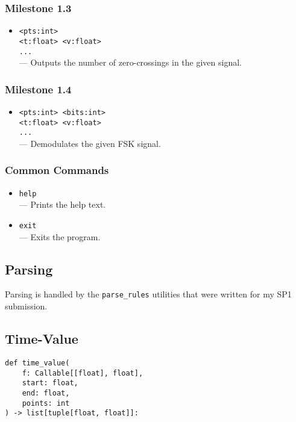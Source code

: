 \documentclass{article}
\begin{document}
			\subsubsection{Milestone 1.3}
				\begin{itemize}
					\item \verb|<pts:int>| \\
						\verb|<t:float> <v:float>| \\
						\verb|...| \\
						--- Outputs the number of zero-crossings in the given signal.
				\end{itemize}

			\subsubsection{Milestone 1.4}
				\begin{itemize}
					\item \verb|<pts:int> <bits:int>| \\
						\verb|<t:float> <v:float>| \\
						\verb|...| \\
						--- Demodulates the given FSK signal.
				\end{itemize}

			\subsubsection{Common Commands}
				\begin{itemize}
					\item \verb|help| \\
						--- Prints the help text.
					\item \verb|exit| \\
						--- Exits the program.
				\end{itemize}

			\pagebreak



		\subsection{Parsing}
			Parsing is handled by the \verb|parse_rules| utilities that were
			written for my SP1 submission.

			\pagebreak



		\subsection{Time-Value}
			\begin{verbatim}
def time_value(
	f: Callable[[float], float],
	start: float,
	end: float,
	points: int
) -> list[tuple[float, float]]:
			\end{verbatim}
\end{document}
